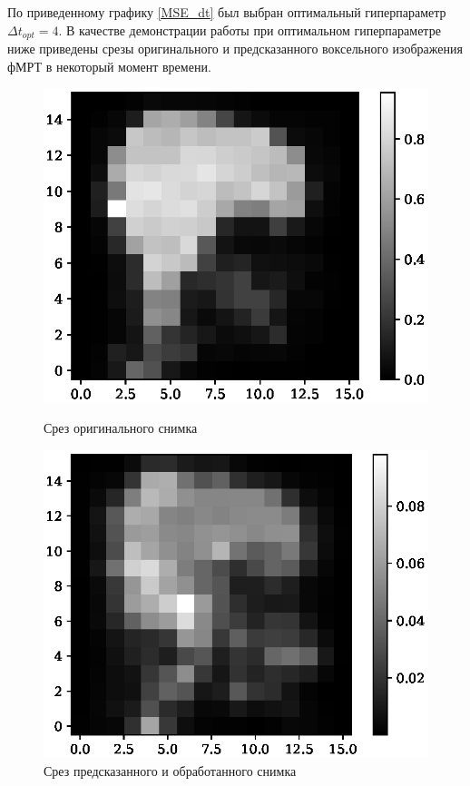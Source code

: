 \documentclass[12pt,twoside]{article}
\begin{document}
По приведенному графику \ref{MSE_dt} был выбран оптимальный гиперпараметр ${\Delta t}_{opt} = 4$.
В качестве демонстрации работы при оптимальном гиперпараметре ниже приведены срезы оригинального и предсказанного воксельного изображения фМРТ в некоторый момент времени.
\begin{figure}[h]
    \begin{center}
    \begin{minipage}[h]{0.4\linewidth}
    \includegraphics[width=1\linewidth]{sub-04-4-4-5-_-_-orig.eps}
    \caption{Срез оригинального снимка} %
    \label{ris:pred} %
    \end{minipage}
    \hfill
    \begin{minipage}[h]{0.4\linewidth}
    \includegraphics[width=1\linewidth]{sub-04-4-4-5-_-_-pred-pg.eps}
    \caption{Срез предсказанного и обработанного снимка}
    \label{ris:pred-pg}
    \end{minipage}
    \end{center}
\end{figure}
\end{document}
